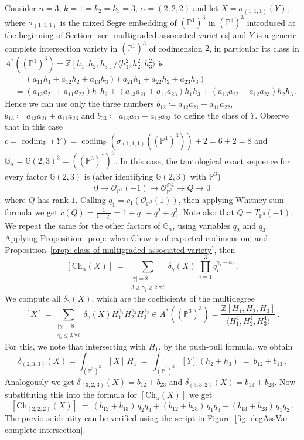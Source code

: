 \documentclass[12pt]{article}
\theoremstyle{definition}
\newenvironment{example}
{\pushQED{\qed}\renewcommand{\qedsymbol}{$\diamond$}\examplex}
{\popQED\endexamplex}
\newcommand{\G}{{\mathbb G}}
\newcommand{\Z}{{\mathbb Z}}
\newcommand{\PP}{{\mathbb P}}
\def\codim{\operatorname{codim}}
\newcommand{\ko}{{\mathcal O}}
\begin{document}
\begin{example}
Consider $n=3$, $k=1=k_2=k_3=3$, $\alpha=(2,2,2)$ and let $X=\sigma_{(1,1,1)}(Y)$, where $\sigma_{(1,1,1)}$ is the mixed Segre embedding of $(\PP^1)^3$ in $(\PP^3)^3$ introduced at the beginning of Section~\ref{sec: multigraded associated varieties} and $Y$ is a generic complete intersection variety in $(\PP^1)^3$ of codimension $2$, in particular its class in $A^*((\PP^1)^3)=\Z[h_1,h_2,h_3]/\langle h_1^2,h_2^2,h_3^2\rangle$ is
\begin{align*}
    [Y] &= (a_{11}h_1+a_{12}h_2+a_{13}h_3)(a_{21}h_1+a_{22}h_2+a_{23}h_3)\\
    &= (a_{12}a_{21}+a_{11}a_{22})h_1h_2+(a_{13}a_{21}+a_{11}a_{23})h_1h_3+(a_{13}a_{22}+a_{12}a_{23})h_2h_3\,.
\end{align*}
Hence we can use only the three numbers $b_{12}\coloneqq a_{12}a_{21}+a_{11}a_{22}$, $b_{13}\coloneqq a_{13}a_{21}+a_{11}a_{23}$ and $b_{23}\coloneqq a_{13}a_{22}+a_{12}a_{23}$ to define the class of $Y$. Observe that in this case $c=\codim_\PP(Y)=\codim_\PP(\sigma_{(1,1,1)}((\PP^1)^3))+2=6+2=8$ and $\G_\alpha=\G(2,3)^3=((\PP^3)^*)^3$.
In this case, the tautological exact sequence for every factor $\G(2,3)$ is (after identifying $\G(2,3)$ with $\PP^3$)
\begin{equation}
    0\to \ko_{\PP^3}(-1) \to \ko_{\PP^3}^{\oplus 4} \to Q \to 0
\end{equation}
where $Q$ has rank $1$. Calling $q_1=c_1(\ko_{\PP^3}(1))$, then applying Whitney sum formula we get $c(Q)=\frac{1}{1-q_1}=1+q_1+q_1^2+q_1^3$. Note also that $Q=T_{\PP^3}(-1)$. We repeat the same for the other factors of $\G_\alpha$, using variables $q_2$ and $q_3$.
Applying Proposition~\ref{prop: when Chow is of expected codimension} and Proposition~\ref{prop: class of multigraded associated variety}, then
\[
    [\mathrm{Ch}_\alpha(X)]\ =\ \sum_{\substack{|\gamma|=8\\3\ge \gamma_i\ge 2\ \forall i}}\delta_\gamma(X)\ \prod_{i=1}^3 q_i^{\gamma_i-\alpha_i}\,.
\]
We compute all $\delta_\gamma(X)$, which are the coefficients of the multidegree
\[
    [X]=\sum_{\substack{|\gamma|=8\\\gamma_i\le 3\ \forall i}}\delta_\gamma(X)H_1^{\gamma_1}H_2^{\gamma_2}H_3^{\gamma_3}\in A^*((\PP^3)^3)=\frac{\Z[H_1,H_2,H_3]}{\langle H_1^4,H_2^4,H_3^4\rangle}\,.
\]
For this, we note that intersecting with $H_1$, by the push-pull formula, we obtain
\[
    \delta_{(2,3,3)}(X)=\int_{(\PP^3)^3}[X]\,H_1\ =\ \int_{(\PP^1)^3}[Y]\,(h_2+h_3)\ =\ b_{12}+b_{13}\,.
\]
Analogously we get $\delta_{(3,2,3)}(X)=b_{12}+b_{23}$ and $\delta_{(3,3,2)}(X)=b_{13}+b_{23}$. Now substituting this into the formula for $[\mathrm{Ch}_\alpha(X)]$ we get
\[
    [\mathrm{Ch}_{(2,2,2)}(X)]\ =\ (b_{12}+b_{13})\,q_2q_3+(b_{12}+b_{23})\,q_1q_3+(b_{13}+b_{23})\,q_1q_2\,.
\]
The previous identity can be verified using the script in Figure~\ref{fig: degAssVar complete intersection}.
\end{example}
\end{document}
